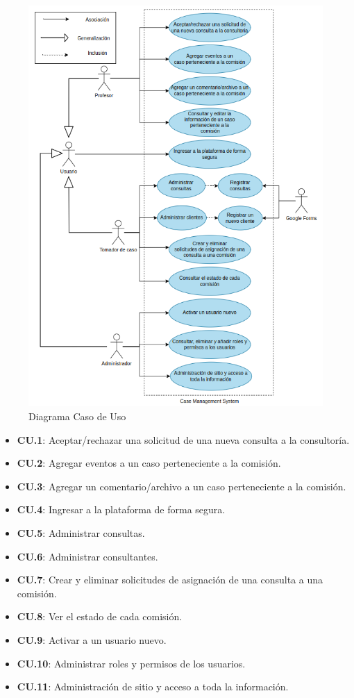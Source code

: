 \begin{figure}[H]
\centering
\includegraphics[width=1\linewidth]{fig/caso-de-uso.png}
\caption{Diagrama Caso de Uso}
\label{fig:caso-de-uso}
\end{figure}

\begin{itemize}
\item \textbf{CU.1}: Aceptar/rechazar una solicitud de una nueva consulta a la consultoría.
\item \textbf{CU.2}: Agregar eventos a un caso perteneciente a la comisión.
\item \textbf{CU.3}: Agregar un comentario/archivo a un caso perteneciente a la comisión.
\item \textbf{CU.4}: Ingresar a la plataforma de forma segura.
\item \textbf{CU.5}: Administrar consultas.
\item \textbf{CU.6}: Administrar consultantes.
\item \textbf{CU.7}: Crear y eliminar solicitudes de asignación de una consulta a una comisión.
\item \textbf{CU.8}: Ver el estado de cada comisión.
\item \textbf{CU.9}: Activar a un usuario nuevo.
\item \textbf{CU.10}: Administrar roles y permisos de los usuarios.
\item \textbf{CU.11}: Administración de sitio y acceso a toda la información.
\end{itemize}


